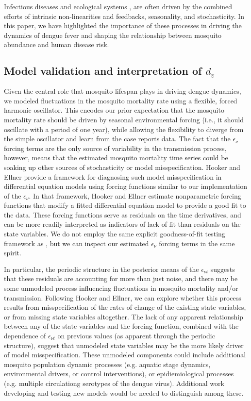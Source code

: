 \documentclass[10pt,letterpaper]{article}
\begin{document}
Infectious diseases \cite{Ellner1998,Koelle2004} and ecological systems \cite{Bjornstad2001}, are often driven by the combined efforts of intrinsic non-linearities and feedbacks, seasonality, and stochasticity.
In this paper, we have highlighted the importance of these processes in driving the dynamics of dengue fever and shaping the relationship between mosquito abundance and human disease risk.

\subsection*{Model validation and interpretation of $d_v$}

Given the central role that mosquito lifespan plays in driving dengue dynamics, we modeled fluctuations in the mosquito mortality rate using a flexible, forced harmonic oscillator.
This encodes our prior expectation that the mosquito mortality rate should be driven by seasonal environmental forcing (i.e., it should oscillate with a period of one year), while allowing the flexibility to diverge from the simple oscillator and learn from the case reports data.
The fact that the $\epsilon_{\nu}$ forcing terms are the only source of variability in the transmission process, however, means that the estimated mosquito mortality time series could be soaking up other sources of stochasticity or model misspecification.
Hooker and Ellner \cite{Hooker2015} provide a framework for diagnosing such model misspecification in differential equation models using forcing functions similar to our implementation of the $\epsilon_{\nu}$.
In that framework, Hooker and Ellner \cite{Hooker2015} estimate nonparametric forcing functions that modify a fitted differential equation model to provide a good fit to the data.
These forcing functions serve as residuals on the time derivatives, and can be more readily interpreted as indicators of lack-of-fit than residuals on the state variables.
We do not employ the same explicit goodness-of-fit testing framework as \cite{Hooker2015}, but we can inspect our estimated $\epsilon_{\nu}$ forcing terms in the same spirit.

In particular, the periodic structure in the posterior means of the $\epsilon_{\nu t}$ suggests that these residuals are accounting for more than just noise, and there may be some unmodeled process influencing fluctuations in mosquito mortality and/or transmission.
Following Hooker and Ellner, we can explore whether this process results from misspecification of the rates of change of the existing state variables, or from missing state variables altogether. 
The lack of any apparent relationship between any of the state variables and the forcing function, combined with the dependence of $\epsilon_{\nu t}$ on previous values (as apparent through the periodic structure), suggest that unmodeled state variables may be the more likely driver of model misspecification.
These unmodeled components could include additional mosquito population dynamic processes (e.g. aquatic stage dynamics, environmental drivers, or control interventions), or epidiemiological processes (e.g. multiple circulationg serotypes of the dengue virus).
Additional work developing and testing new models would be needed to distinguish among these.
\end{document}
